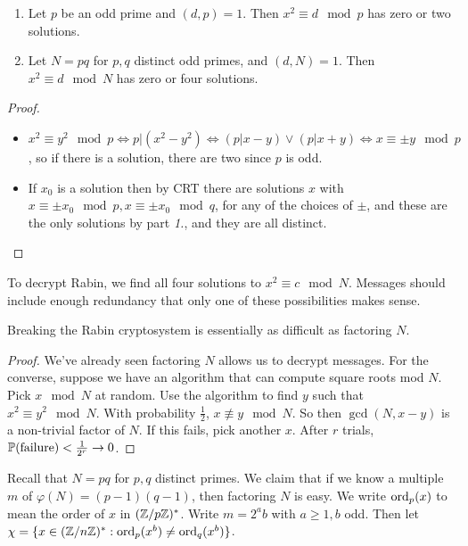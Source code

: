 \documentclass[10pt,a4paper]{article}
\begin{document}
\begin{lemma}
\item
\begin{enumerate}
\item Let $p$ be an odd prime and $(d,p) = 1$. Then $x^2 \equiv d \mod p$ has zero or two solutions.
\item Let $N = pq$ for $p,q$ distinct odd primes, and $(d,N) = 1$. Then $x^2 \equiv d \mod N$ has zero or four solutions.
\end{enumerate}
\end{lemma}
\begin{proof}
\item
\begin{itemize}
\item $x^2 \equiv y^2 \mod p \iff p|(x^2-y^2) \iff (p|x-y)\vee(p|x+y)\iff x \equiv \pm y \mod p$, so if there is a solution, there are two since $p$ is odd.
\item If $x_0$ is a solution then by CRT there are solutions $x$ with $x\equiv \pm x_0 \mod p, x \equiv \pm x_0 \mod q$, for any of the choices of $\pm$, and these are the only solutions by part \textit{1.}, and they are all distinct.
\end{itemize}
\end{proof}
To decrypt Rabin, we find all four solutions to $x^2 \equiv c \mod N$. Messages should include enough redundancy that only one of these possibilities makes sense.

\begin{theorem}
Breaking the Rabin cryptosystem is essentially as difficult as factoring $N$.
\end{theorem}
\begin{proof}
We've already seen factoring $N$ allows us to decrypt messages. For the converse, suppose we have an algorithm that can compute square roots mod $N$. Pick $x \mod N$ at random. Use the algorithm to find $y$ such that $x^2 \equiv y^2 \mod N$. With probability $\frac12$, $x \nequiv y \mod N$. So then $\gcd(N, x-y)$ is a non-trivial factor of $N$. If this fails, pick another $x$. After $r$ trials, $\P(\text{failure}) < \frac{1}{2^r} \to 0$.
\end{proof}

Recall that $N = pq$ for $p,q$ distinct primes. We claim that if we know a multiple $m$ of $\varphi(N) = (p-1)(q-1)$, then factoring $N$ is easy. We write $\ord_p(x)$ to mean the order of $x$ in $(\Z/p\Z)^\ast$. Write $m  = 2^a b$ with $a \geq 1, b$ odd. Then let $\chi = \{x \in (\Z/n\Z)^\ast : \ord_p(x^b) \neq \ord_q(x^b)\}$.
\end{document}
